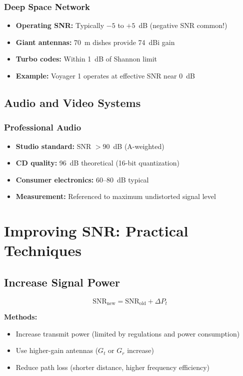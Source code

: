 \subsubsection{Deep Space Network}

\begin{itemize}
\item \textbf{Operating SNR:} Typically $-5$ to $+5$~dB (negative SNR common!)
\item \textbf{Giant antennas:} 70~m dishes provide 74~dBi gain
\item \textbf{Turbo codes:} Within 1~dB of Shannon limit
\item \textbf{Example:} Voyager 1 operates at effective SNR near 0~dB
\end{itemize}

\subsection{Audio and Video Systems}

\subsubsection{Professional Audio}

\begin{itemize}
\item \textbf{Studio standard:} SNR $>90$~dB (A-weighted)
\item \textbf{CD quality:} 96~dB theoretical (16-bit quantization)
\item \textbf{Consumer electronics:} 60--80~dB typical
\item \textbf{Measurement:} Referenced to maximum undistorted signal level
\end{itemize}

\section{Improving SNR: Practical Techniques}

\subsection{Increase Signal Power}

\begin{equation}
\mathrm{SNR_{new}} = \mathrm{SNR_{old}} + \Delta P_t
\end{equation}

\textbf{Methods:}
\begin{itemize}
\item Increase transmit power (limited by regulations and power consumption)
\item Use higher-gain antennas ($G_t$ or $G_r$ increase)
\item Reduce path loss (shorter distance, higher frequency efficiency)
\end{itemize}


